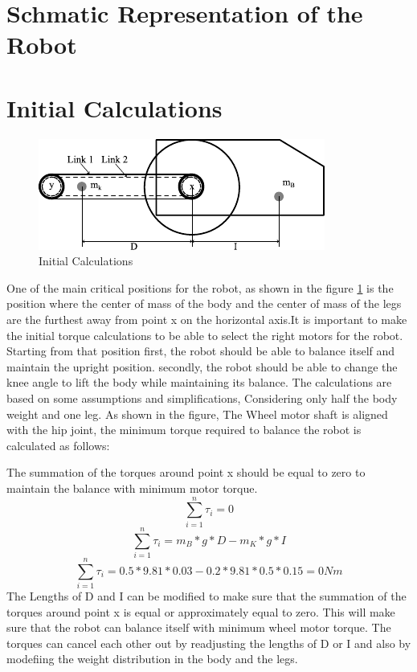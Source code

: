\section{Schmatic Representation of the Robot}

\section{Initial Calculations}
\begin{figure}[h]
	\centering
	\includegraphics[width=0.7\linewidth]{Initial Calculations}
	\caption[Initial Calculations]{Initial Calculations}
	\label{fig:initialcalculations}
\end{figure}
One of the main critical positions for the robot, as shown in the figure \ref{fig:initialcalculations} is the position where the center of mass of the body and the center of mass of the legs are the furthest away from point x on the horizontal axis.It is important to make the initial torque calculations to be able to select the right motors for the robot.
Starting from that position first, the robot should be able to balance itself and maintain the upright position.
secondly, the robot should be able to change the knee angle to lift the body while maintaining its balance.
The calculations are based on some assumptions and simplifications, Considering only half the body weight and one leg.
As shown in the figure, The Wheel motor shaft is aligned with the hip joint, the minimum torque required to balance the robot is calculated as follows:

The summation of the torques around point x should be equal to zero to maintain the balance with minimum motor torque.
\begin{equation}
	\sum_{i=1}^{n} \tau_{i}=0
\end{equation}
\begin{equation}
	\sum_{i=1}^{n} \tau_{i}=m_{B}*g*D-m_{K}*g*I
\end{equation}
\begin{equation}
	\sum_{i=1}^{n} \tau_{i}=0.5*9.81*0.03-0.2*9.81*0.5*0.15=0 Nm
\end{equation}
The Lengths of D and I can be modified to make sure that the summation of the torques around point x is equal or approximately equal to zero.
This will make sure that the robot can balance itself with minimum wheel motor torque.
The torques can cancel each other out by readjusting the lengths of D or I and also by modefiing the weight distribution in the body and the legs.

